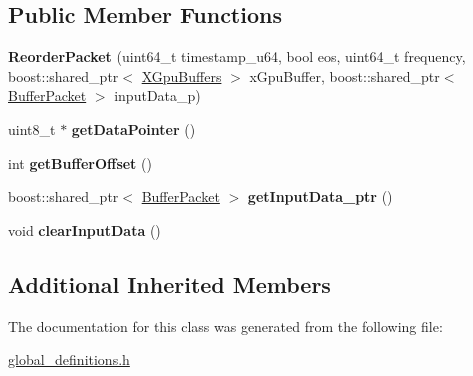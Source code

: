 \subsection*{Public Member Functions}
\begin{DoxyCompactItemize}
\item 
{\bfseries Reorder\+Packet} (uint64\+\_\+t timestamp\+\_\+u64, bool eos, uint64\+\_\+t frequency, boost\+::shared\+\_\+ptr$<$ \hyperlink{class_x_gpu_buffers}{X\+Gpu\+Buffers} $>$ x\+Gpu\+Buffer, boost\+::shared\+\_\+ptr$<$ \hyperlink{class_buffer_packet}{Buffer\+Packet} $>$ input\+Data\+\_\+p)\hypertarget{class_reorder_packet_afd8f0e21d3f64c479fad865c81945419}{}\label{class_reorder_packet_afd8f0e21d3f64c479fad865c81945419}

\item 
uint8\+\_\+t $\ast$ {\bfseries get\+Data\+Pointer} ()\hypertarget{class_reorder_packet_a8038cc06067c87547d5b05a18bd25cd5}{}\label{class_reorder_packet_a8038cc06067c87547d5b05a18bd25cd5}

\item 
int {\bfseries get\+Buffer\+Offset} ()\hypertarget{class_reorder_packet_aa925275f021c5428303c3274735a2f5f}{}\label{class_reorder_packet_aa925275f021c5428303c3274735a2f5f}

\item 
boost\+::shared\+\_\+ptr$<$ \hyperlink{class_buffer_packet}{Buffer\+Packet} $>$ {\bfseries get\+Input\+Data\+\_\+ptr} ()\hypertarget{class_reorder_packet_a41424bd411ee8501fec48967dbecfbda}{}\label{class_reorder_packet_a41424bd411ee8501fec48967dbecfbda}

\item 
void {\bfseries clear\+Input\+Data} ()\hypertarget{class_reorder_packet_a117ea02ce1d510cecd288fd54f591f4e}{}\label{class_reorder_packet_a117ea02ce1d510cecd288fd54f591f4e}

\end{DoxyCompactItemize}
\subsection*{Additional Inherited Members}


The documentation for this class was generated from the following file\+:\begin{DoxyCompactItemize}
\item 
\hyperlink{global__definitions_8h}{global\+\_\+definitions.\+h}\end{DoxyCompactItemize}

